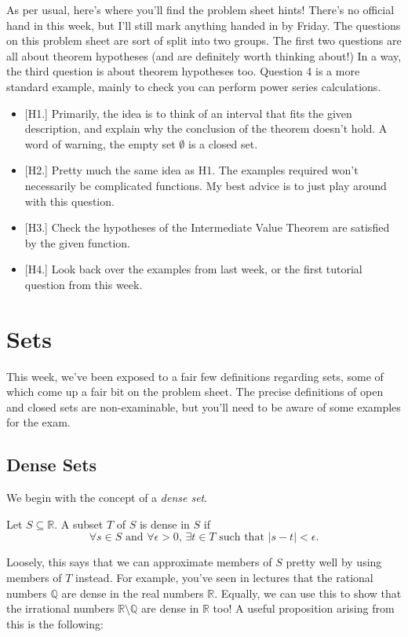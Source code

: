 \documentclass[
  12pt,
  a4paper]{extarticle}
\providecommand{\tightlist}{%
  \setlength{\itemsep}{0pt}\setlength{\parskip}{0pt}}
\theoremstyle{plain}
\theoremstyle{plain}
\theoremstyle{plain}
\theoremstyle{plain}
\theoremstyle{plain}
\theoremstyle{definition}
\theoremstyle{definition}
\theoremstyle{definition}
\theoremstyle{remark}
\let\BeginKnitrBlock\begin \let\EndKnitrBlock\end
\renewcommand{\;}{\,}
\begin{document}
As per usual, here's where you'll find the problem sheet hints! There's no official hand in this week, but I'll still mark anything handed in by Friday. The questions on this problem sheet are sort of split into two groups. The first two questions are all about theorem hypotheses (and are definitely worth thinking about!) In a way, the third question is about theorem hypotheses too. Question 4 is a more standard example, mainly to check you can perform power series calculations.

\begin{itemize}
\tightlist
\item
  {[}H1.{]} Primarily, the idea is to think of an interval that fits the given description, and explain why the conclusion of the theorem doesn't hold. A word of warning, the empty set \(\emptyset\) is a closed set.
\item
  {[}H2.{]} Pretty much the same idea as H1. The examples required won't necessarily be complicated functions. My best advice is to just play around with this question.
\item
  {[}H3.{]} Check the hypotheses of the Intermediate Value Theorem are satisfied by the given function.
\item
  {[}H4.{]} Look back over the examples from last week, or the first tutorial question from this week.
\end{itemize}

\hypertarget{sets}{%
\section{Sets}\label{sets}}

This week, we've been exposed to a fair few definitions regarding sets, some of which come up a fair bit on the problem sheet. The precise definitions of open and closed sets are non-examinable, but you'll need to be aware of some examples for the exam.

\hypertarget{dense-sets}{%
\subsection{Dense Sets}\label{dense-sets}}

We begin with the concept of a \emph{dense set}.
\BeginKnitrBlock{definition}[Dense Set]
{\label{def:def3} }Let \(S \subseteq \mathbb{R}\). A subset \(T\) of \(S\) is dense in \(S\) if \[\forall s \in S \;\;\text{and}\;\; \forall \epsilon > 0,\; \exists t \in T \;\; \text{such that}\;\; \lvert s - t \rvert < \epsilon.\]
\EndKnitrBlock{definition}
Loosely, this says that we can approximate members of \(S\) pretty well by using members of \(T\) instead. For example, you've seen in lectures that the rational numbers \(\mathbb{Q}\) are dense in the real numbers \(\mathbb{R}\). Equally, we can use this to show that the irrational numbers \(\mathbb{R}\setminus\mathbb{Q}\) are dense in \(\mathbb{R}\) too! A useful proposition arising from this is the following:
\end{document}
